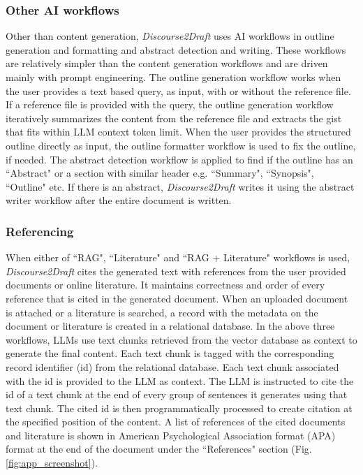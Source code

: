 \documentclass[utf8]{FrontiersinHarvard} %
\newcommand{\appname}{\emph{Discourse2Draft}}
\begin{document}
\subsubsection{Other AI workflows}

Other than content generation, \appname{} uses AI workflows in outline generation and formatting and abstract detection and writing. These workflows are relatively simpler than the content generation workflows and are driven mainly with prompt engineering. The outline generation workflow works when the user provides a text based query, as input, with or without the reference file. If a reference file is provided with the query, the outline generation workflow iteratively summarizes the content from the reference file and extracts the gist that fits within LLM context token limit. When the user provides the structured outline directly as input, the outline formatter workflow is used to fix the outline, if needed. The abstract detection workflow is applied to find if the outline has an ``Abstract" or a section with similar header e.g. ``Summary", ``Synopsis", ``Outline" etc. If there is an abstract, \appname{} writes it using the abstract writer workflow after the entire document is written.

\subsubsection{Referencing}
When either of ``RAG", ``Literature" and ``RAG + Literature" workflows is used, \appname{} cites the generated text with references from the user provided documents or online literature. It maintains correctness and order of every reference that is cited in the generated document. When an uploaded document is attached or a literature is searched, a record with the metadata on the document or literature is created in a relational database. In the above three workflows, LLMs use text chunks retrieved from the vector database as context to generate the final content. Each text chunk is tagged with the corresponding record identifier (id) from the relational database. Each text chunk associated with the id is provided to the LLM as context. The LLM is instructed to cite the id of a text chunk at the end of every group of sentences it generates using that text chunk. The cited id is then programmatically processed to create citation at the specified position of the content. A list of references of the cited documents and literature is shown in American Psychological Association format (APA) format at the end of the document under the ``References" section (Fig. \ref{fig:app_screenshot}). 
\end{document}
